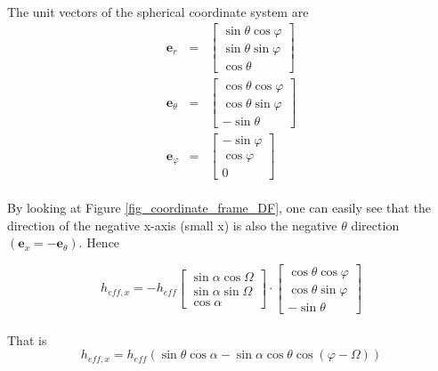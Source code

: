 \documentclass[a4paper,10pt]{thesis}
\begin{document}
\paragraph*{}
The unit vectors of the spherical coordinate system are
\begin{eqnarray}
\textbf{e}_r &=& \left[ \begin{array}{c}
\sin \theta \cos \varphi\\
\sin \theta \sin \varphi\\
\cos \theta
\end{array}  \right] \\
\textbf{e}_\theta &=& \left[ \begin{array}{c}
\cos \theta \cos \varphi\\
\cos \theta \sin \varphi\\
-\sin \theta
\end{array}  \right] \\
\textbf{e}_\varphi &=& \left[ \begin{array}{c}
-\sin  \varphi\\
\cos \varphi\\
0
\end{array}  \right]
\end{eqnarray}
\paragraph*{}
By looking at Figure \ref{fig_coordinate_frame_DF}, one can easily see that the direction of the negative x-axis (small x) is also the negative $\theta$ direction  $(\textbf{e}_x=-\textbf{e}_\theta)$. Hence

\begin{equation}
{h}_{eff,x} = -h_{eff} \left[ \begin{array}{c}
\sin \alpha \cos \Omega\\
\sin \alpha \sin \Omega\\
\cos \alpha
\end{array}  \right] \cdot \left[ \begin{array}{c}
\cos \theta \cos \varphi\\
\cos \theta \sin \varphi\\
-\sin \theta
\end{array}  \right]
\end{equation}
\paragraph*{}
That is
\begin{equation}
{h}_{eff,x} = h_{eff}( \sin \theta \cos \alpha - \sin \alpha \cos\theta\cos (\varphi - \Omega ) )\label{heff_x}
\end{equation}
\end{document}
